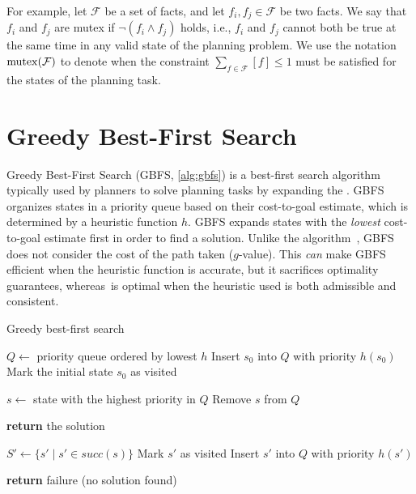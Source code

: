 \documentclass[ppgc,diss,english]{iiufrgs}
\begin{document}
For example, let $\mathcal{F}$ be a set of facts, and let $f_i, f_j \in \mathcal{F}$ be two facts. We say that $f_i$ and $f_j$ are mutex if $\neg(f_i \land f_j)$ holds, i.e., $f_i$ and $f_j$ cannot both be true at the same time in any valid state of the planning problem.
We use the notation $\operatorname{mutex}(\mathcal{F})$ to denote when the constraint $\sum_{f\in \mathcal{F}} [f]\leq 1$ must be satisfied for the states of the planning task.


\section{Greedy Best-First Search}
\label{sec:background-gbfs}
Greedy Best-First Search (GBFS, \cref{alg:gbfs}) is a best-first search algorithm typically used by planners to solve planning tasks by expanding the \fsp. GBFS organizes states in a priority queue based on their cost-to-goal estimate, which is determined by a heuristic function $h$. GBFS expands states with the \emph{lowest} cost-to-goal estimate first in order to find a solution. Unlike the \astar algorithm~\cite{Hart.etal/1968}, GBFS does not consider the cost of the path taken ($g$-value). This \emph{can} make GBFS efficient when the heuristic function is accurate, but it sacrifices optimality guarantees, whereas~\astar is optimal when the heuristic used is both admissible and consistent.

\begin{algorithm}[tb]
\caption{Greedy best-first search}
\label{alg:gbfs}
\begin{algorithmic}[1]
  \State $Q \gets$ priority queue ordered by lowest $h$
    \State Insert $s_0$ into $Q$ with priority $h(s_0)$
    \State Mark the initial state $s_0$ as visited
  \EndIf

    \State $s \gets$ state with the highest priority in $Q$
    \State Remove $s$ from $Q$

      \State \textbf{return} the solution
    \EndIf

    \State $S' \gets \{s' \mid s' \in succ(s)\}$
        \State Mark $s'$ as visited
        \State Insert $s'$ into $Q$ with priority $h(s')$
      \EndIf
    \EndFor
  \EndWhile

  \State \textbf{return} failure (no solution found)
\EndProcedure
\end{algorithmic}
\end{algorithm}
\end{document}
